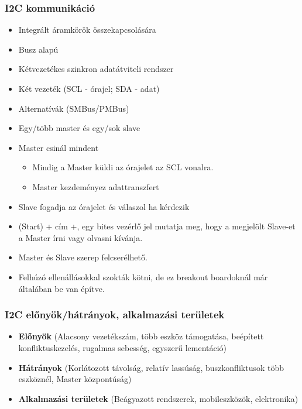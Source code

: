 \subsubsection{I2C kommunikáció}
\begin{itemize}
    \item Integrált áramkörök összekapcsolására
    \item Busz alapú
    \item Kétvezetékes szinkron adatátviteli rendszer
    \item Két vezeték (SCL - órajel; SDA - adat)
    \item Alternatívák (SMBus/PMBus)
    \item Egy/több master és egy/sok slave
    \item Master csinál mindent
    \begin{itemize}
        \item Mindig a Master küldi az órajelet az SCL vonalra.
        \item Master kezdeményez adattranszfert
    \end{itemize}
    \item Slave fogadja az órajelet és válaszol ha kérdezik
    \item (Start) + cím +, egy bites vezérlő jel mutatja meg, hogy a megjelölt Slave-et a Master írni vagy olvasni kívánja.
    \item Master és Slave szerep felcserélhető.
    \item Felhúzó ellenállásokkal szokták kötni, de ez breakout boardoknál már általában be van építve.
\end{itemize}

\subsubsection{I2C előnyök/hátrányok, alkalmazási területek}
\begin{itemize}
    \item \textbf{Előnyök} (Alacsony vezetékszám, több eszköz támogatása, beépített konfliktuskezelés, rugalmas sebesség, egyszerű lementáció)
    \item \textbf{Hátrányok} (Korlátozott távolság, relatív lassúság, buszkonfliktusok több eszköznél, Master központúság)
    \item \textbf{Alkalmazási területek} (Beágyazott rendszerek, mobileszközök, elektronika)
\end{itemize}

